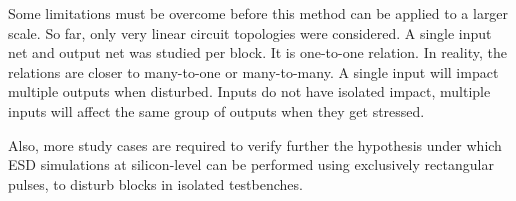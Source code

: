 Some limitations must be overcome before this method can be applied to a larger scale.
So far, only very linear circuit topologies were considered.
A single input net and output net was studied per block.
It is one-to-one relation.
In reality, the relations are closer to many-to-one or many-to-many.
A single input will impact multiple outputs when disturbed.
Inputs do not have isolated impact, multiple inputs will affect the same group of outputs when they get stressed.

Also, more study cases are required to verify further the hypothesis under which ESD simulations at silicon-level can be performed using exclusively rectangular pulses, to disturb blocks in isolated testbenches.
